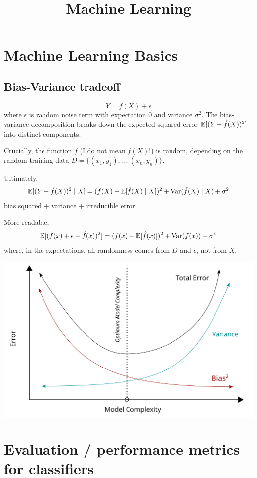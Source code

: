 \documentclass[twoside,11pt]{article}
\title{Machine Learning}
\begin{document}
\maketitle
\tableofcontents

\section{Machine Learning Basics}
\subsection{Bias-Variance tradeoff}
$$ Y = f(X) + \epsilon $$
where $\epsilon$ is random noise term with expectation 0 and variance $\sigma^2$.
The bias-variance decomposition breaks down the expected squared error $\mathbb{E}[(Y-\hat f(X))^2]$ into distinct components.

Crucially, the function $\hat f$ (I do not mean $\hat f(X)$!) is random, depending on the random training data $D = \{(x_1,y_1), \dots, (x_n,y_n)\}$.

Ultimately,
$$ \mathbb{E}[(Y-\hat f(X))^2 \mid X] = (f(X)-\mathbb{E}[\hat f(X) \mid X])^2 + \mathrm{Var}(\hat f(X) \mid X) + \sigma^2 $$
bias squared + variance + irreducible error

More readable,
$$ \mathbb{E}[(f(x)+\epsilon - \hat f(x))^2] = (f(x) - \mathbb{E}[\hat f(x)])^2 + \mathrm{Var}(\hat f(x)) + \sigma^2 $$
where, in the expectations, all randomness comes from $D$ and $\epsilon$, not from $X$.

\begin{center}
    \includegraphics[width=.9\textwidth]{bias-variance-tradeoff.png}
\end{center}

\section{Evaluation / performance metrics for classifiers}
\end{document}

